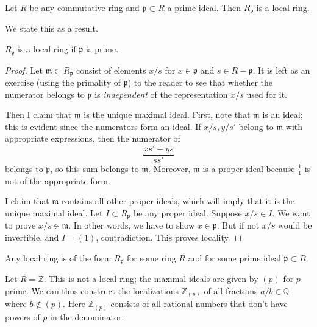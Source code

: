 \begin{example} 
Let $R$ be any commutative ring and $\mathfrak{p}\subset R$ a prime ideal. Then
$R_{\mathfrak{p}}$ is a local ring.  

We state this as a result.
\begin{proposition} 
$R_{\mathfrak{p}}$ is a local ring if $\mathfrak{p}$ is prime.\end{proposition} 
\begin{proof} 
Let $\mathfrak{m} \subset R_{\mathfrak{p}}$ consist of elements $x/s$ for $x
\in \mathfrak{p}$ and $s \in R - \mathfrak{p}$. It is left as an exercise
(using the primality of $\mathfrak{p}$) to
the reader to see that whether the numerator belongs to $\mathfrak{p}$ is
\emph{independent} of the representation $x/s$ used for it.

Then I claim that $\mathfrak{m}$ is the
unique maximal ideal. First, note that $\mathfrak{m}$ is
an ideal; this is evident since the numerators form an ideal. If $x/s, y/s'$
belong to $\mathfrak{m}$ with appropriate expressions, then
the numerator of
\[ \frac{xs'+ys}{ss'}  \]
belongs to $\mathfrak{p}$, so this sum belongs to $\mathfrak{m}$.  Moreover,
$\mathfrak{m}$ is a proper ideal because $\frac{1}{1}$ is not of the
appropriate form.

I claim that $\mathfrak{m}$ contains all other proper ideals, which will imply
that it is the unique maximal ideal. Let $I \subset R_{\mathfrak{p}}$ be any
proper ideal. Suppose $x/s \in I$.  We want to prove $x/s \in \mathfrak{m}$.
In other words, we have to show $x \in \mathfrak{p}$. But if not $x/s$ would be
invertible, and $I = (1)$, contradiction. This proves locality.  
\end{proof} 
\end{example} 

\begin{exercise} 
Any local ring is of the form $R_{\mathfrak{p}}$ for some ring $R$ and for
some prime ideal $\mathfrak{p} \subset R$.
\end{exercise} 

\begin{example} 
Let $R = \mathbb{Z}$. This is not a local ring; the maximal ideals are given by
$(p)$ for $p$ prime.  We can thus construct the localizations
$\mathbb{Z}_{(p)}$ of all fractions $a/b \in \mathbb{Q}$ where $b \notin (p)$.
Here $\mathbb{Z}_{(p)}$ consists of all rational numbers that don't have powers of $p$ in the denominator.  
\end{example} 

